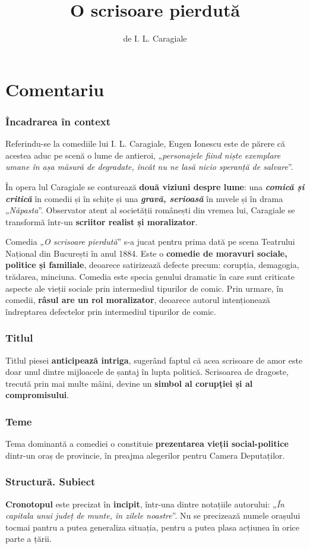 \documentclass{article}
\title{O scrisoare pierdută}
\author{de I. L. Caragiale}
\date{}
\newcommand{\qu}[1]{„\emph{#1}”}
\begin{document}
\maketitle

\part*{Comentariu}
\section{Încadrarea în context}
Referindu-se la comediile lui I. L. Caragiale, Eugen Ionescu este de părere că acestea aduc pe scenă o lume de antieroi, \qu{personajele fiind niște exemplare umane în așa măsură de degradate, încât nu ne lasă nicio speranță de salvare}.

În opera lul Caragiale se conturează \textbf{două viziuni despre lume}: una \textsl{\textbf{comică și critică}} în comedii și în schițe și una \textsl{\textbf{gravă, serioasă}} în nuvele și în drama \qu{Năpasta}. Observator atent al societății românești din vremea lui, Caragiale se transformă într-un \textbf{scriitor realist și moralizator}.

Comedia \qu{O scrisoare pierdută} s-a jucat pentru prima dată pe scena Teatrului Național din București în anul 1884. Este o \textbf{comedie de moravuri sociale, politice și familiale}, deoarece satirizează defecte precum: corupția, demagogia, trădarea, minciuna. Comedia este specia genului dramatic în care sunt criticate aspecte ale vieții sociale prin intermediul tipurilor de comic. Prin urmare, în comedii, \textbf{râsul are un rol moralizator}, deoarece autorul intenționează îndreptarea defectelor prin intermediul tipurilor de comic.
\section{Titlul}
Titlul piesei \textbf{anticipează intriga}, sugerând faptul că acea scrisoare de amor este doar unul dintre mijloacele de șantaj în lupta politică. Scrisoarea de dragoste, trecută prin mai multe mâini, devine un \textbf{simbol al corupției și al compromisului}.
\section{Teme}
Tema dominantă a comediei o constituie \textbf{prezentarea vieții social-politice} dintr-un oraș de provincie, în preajma alegerilor pentru Camera Deputaților.
\section{Structură. Subiect}
\textbf{Cronotopul} este precizat în \textbf{incipit}, într-una dintre notațiile autorului: \qu{În capitala unui județ de munte, în zilele noastre}. Nu se precizează numele orașului tocmai pantru a putea generaliza situația, pentru a putea plasa acțiunea în orice parte a țării.
\end{document}

